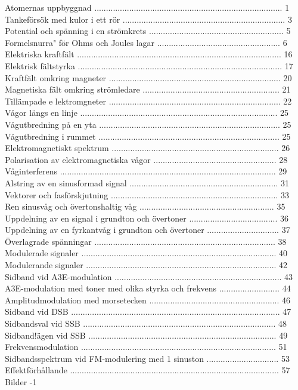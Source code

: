 Atomernas uppbyggnad ................................................................................. 1
Tankeförsök med kulor i ett rör ...................................................................... 3
Potential och spänning i en strömkrets .......................................................... 5
Formelsnurra" för Ohms och Joules lagar ..................................................... 6
Elektriska kraftfält ........................................................................................ 16
Elektrisk fältstyrka ........................................................................................ 17
Kraftfält omkring magneter .......................................................................... 20
Magnetiska fält omkring strömledare ........................................................... 21
Tillämpade e lektromgneter .......................................................................... 22
Vågor längs en linje ..................................................................................... 25
Vågutbredning på en yta .............................................................................. 25
Vågutbredning i rummet .............................................................................. 25
Elektromagnetiskt spektrum ........................................................................ 26
Polarisation av elektromagnetiska vågor ..................................................... 28
Våginterferens ............................................................................................. 29
Alstring av en sinusformad signal ................................................................ 31
Vektorer och fasförskjutning ........................................................................ 33
Ren sinusvåg och övertonshaltig våg .......................................................... 35
Uppdelning av en signal i grundton och övertoner ...................................... 36
Uppdelning av en fyrkantvåg i grundton och övertoner ............................... 37
Överlagrade spänningar .............................................................................. 38
Modulerade signaler .................................................................................... 40
Modulerande signaler .................................................................................. 42
Sidband vid A3E-modulation ........................................................................ 43
A3E-modulation med toner med olika styrka och frekvens .......................... 44
Amplitudmodulation med morsetecken ........................................................ 46
Sidband vid DSB .......................................................................................... 47
Sidbandsval vid SSB ................................................................................... 48
Sidband!ägen vid SSB ................................................................................. 49
Frekvensmodulation .................................................................................... 51
Sidbandsspektrum vid FM-modulering med 1 sinuston ............................... 53
Effektförhållande .......................................................................................... 57
Bilder -1

